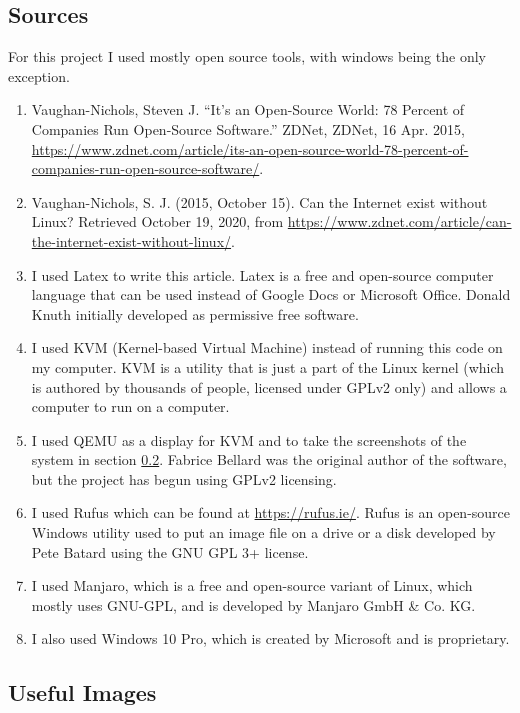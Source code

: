 \documentclass{article}
\begin{document}
\subsection{Sources}\label{sources}
For this project I used mostly open source tools, with windows being the only exception.
\begin{enumerate}
    \item\label{78percent}  Vaughan-Nichols, Steven J. “It's an Open-Source World: 78 Percent of Companies Run Open-Source Software.” ZDNet, ZDNet, 16 Apr. 2015, \url{https://www.zdnet.com/article/its-an-open-source-world-78-percent-of-companies-run-open-source-software/}. 
    \item\label{WWWrunsOnLinux} Vaughan-Nichols, S. J. (2015, October 15). Can the Internet exist without Linux? Retrieved October 19, 2020, from \url{ https://www.zdnet.com/article/can-the-internet-exist-without-linux/}.
    \item I used Latex to write this article. Latex is a free and open-source computer language that can be used instead of Google Docs or Microsoft Office. Donald Knuth initially developed \Latex as permissive free software.
    \item I used KVM (Kernel-based Virtual Machine) instead of running this code on my computer. KVM is a utility that is just a part of the Linux kernel (which is authored by thousands of people, licensed under GPLv2 only) and allows a computer to run on a computer. 
    \item I used QEMU as a display for KVM and to take the screenshots of the system in section \ref{images}. Fabrice Bellard was the original author of the software, but the project has begun using GPLv2 licensing.
    \item I used Rufus which can be found at \url{https://rufus.ie/}. Rufus is an open-source Windows utility used to put an image file on a drive or a disk developed by Pete Batard using the GNU GPL 3+ license.
    \item I used Manjaro, which is a free and open-source variant of Linux, which mostly uses GNU-GPL, and is developed by Manjaro GmbH \& Co. KG.
    \item I also used Windows 10 Pro, which is created by Microsoft and is proprietary.
\end{enumerate}


\pagebreak
\subsection{Useful Images}\label{images}
\end{document}
